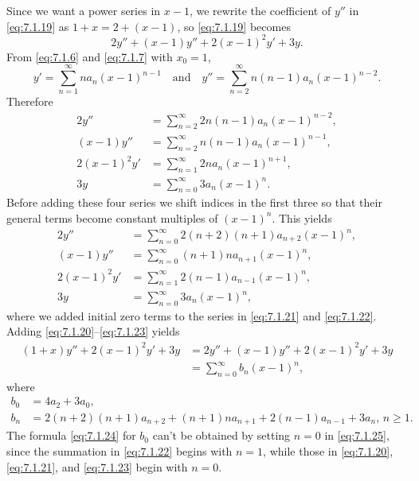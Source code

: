 \begin{solution}
Since we want a  power series in $x-1$,
we rewrite the coefficient of $y''$ in \eqref{eq:7.1.19} as
$1+x=2+(x-1)$, so   \eqref{eq:7.1.19} becomes
\[
2y''+(x-1)y''+2(x-1)^2y'+3y.
\]
From \eqref{eq:7.1.6}  and \eqref{eq:7.1.7} with $x_0=1$,
\[
y'=\sum_{n=1}^\infty na_n(x-1)^{n-1}\quad\text{and}\quad
y ''=\sum_{n=2}^\infty n(n-1)a_n(x-1)^{n-2}.
\]
Therefore
\begin{align*}
2y ''&=\sum_{n=2}^\infty 2n(n-1)a_n(x-1)^{n-2},\\
(x-1)y ''&=\sum_{n=2}^\infty n(n-1)a_n(x-1)^{n-1},\\
2(x-1)^2y'&=\sum_{n=1}^\infty2na_n(x-1)^{n+1},\\
3y&=\sum_{n=0}^\infty 3a_n (x-1)^n.
\end{align*}
Before adding these four series we shift indices in the first three so
that their general terms become constant multiples of $(x-1)^n$. This
yields
\begin{align}
2y ''&=\sum_{n=0}^\infty 2(n+2)(n+1)a_{n+2}(x-1)^n,\label{eq:7.1.20}\\
(x-1)y''&=\sum_{n=0}^\infty (n+1)na_{n+1}(x-1)^n,
\label{eq:7.1.21}\\
2(x-1)^2y'&=\sum_{n=1}^\infty 2(n-1)a_{n-1}(x-1)^n,\label{eq:7.1.22}\\
3y&=\sum_{n=0}^\infty 3a_n (x-1)^n, \label{eq:7.1.23}
\end{align}
where we added initial zero terms to the series in \eqref{eq:7.1.21}
and \eqref{eq:7.1.22}.  Adding \eqref{eq:7.1.20}--\eqref{eq:7.1.23} yields
\begin{align*}
(1+x)y''+2(x-1)^2y'+3y
&=2y''+(x-1)y''+2(x-1)^2y'+3y\\
&=\sum_{n=0}^\infty  b_n (x-1)^n,
\end{align*}
where
\begin{align}
b_0&=4a_2+3a_0, \label{eq:7.1.24}\\
b_n&=2(n+2)(n+1)a_{n+2}+(n+1)na_{n+1}+2(n-1)a_{n-1}+3a_n,\,
n\ge1\label{eq:7.1.25}.
\end{align}
The formula \eqref{eq:7.1.24} for $b_0$  can't be obtained by
setting $n=0$ in \eqref{eq:7.1.25}, since the summation in \eqref{eq:7.1.22}
begins with $n=1$,  while those in \eqref{eq:7.1.20}, \eqref{eq:7.1.21},
and \eqref{eq:7.1.23} begin with $n=0$.
\end{solution}

